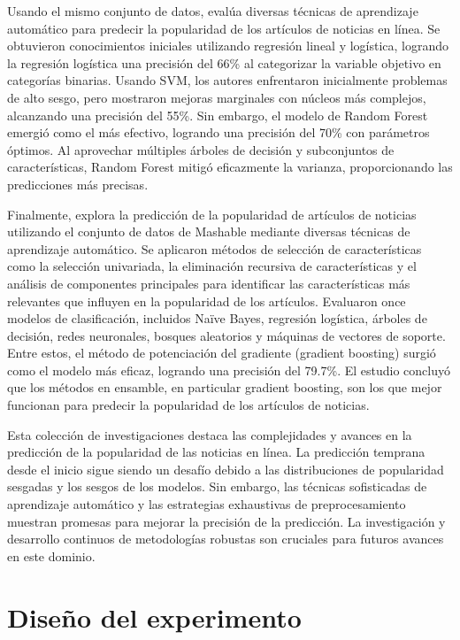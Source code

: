 \documentclass[
  number,
  preprint,
  3p,
  twocolumn]{elsarticle}
\begin{document}
Usando el mismo conjunto de datos, \citep{Ren2015PredictingAE} evalúa
diversas técnicas de aprendizaje automático para predecir la popularidad
de los artículos de noticias en línea. Se obtuvieron conocimientos
iniciales utilizando regresión lineal y logística, logrando la regresión
logística una precisión del 66\% al categorizar la variable objetivo en
categorías binarias. Usando SVM, los autores enfrentaron inicialmente
problemas de alto sesgo, pero mostraron mejoras marginales con núcleos
más complejos, alcanzando una precisión del 55\%. Sin embargo, el modelo
de Random Forest emergió como el más efectivo, logrando una precisión
del 70\% con parámetros óptimos. Al aprovechar múltiples árboles de
decisión y subconjuntos de características, Random Forest mitigó
eficazmente la varianza, proporcionando las predicciones más precisas.

Finalmente, \citep{khan2018} explora la predicción de la popularidad de
artículos de noticias utilizando el conjunto de datos de Mashable
mediante diversas técnicas de aprendizaje automático. Se aplicaron
métodos de selección de características como la selección univariada, la
eliminación recursiva de características y el análisis de componentes
principales para identificar las características más relevantes que
influyen en la popularidad de los artículos. Evaluaron once modelos de
clasificación, incluidos Naïve Bayes, regresión logística, árboles de
decisión, redes neuronales, bosques aleatorios y máquinas de vectores de
soporte. Entre estos, el método de potenciación del gradiente (gradient
boosting) surgió como el modelo más eficaz, logrando una precisión del
79.7\%. El estudio concluyó que los métodos en ensamble, en particular
gradient boosting, son los que mejor funcionan para predecir la
popularidad de los artículos de noticias.

Esta colección de investigaciones destaca las complejidades y avances en
la predicción de la popularidad de las noticias en línea. La predicción
temprana desde el inicio sigue siendo un desafío debido a las
distribuciones de popularidad sesgadas y los sesgos de los modelos. Sin
embargo, las técnicas sofisticadas de aprendizaje automático y las
estrategias exhaustivas de preprocesamiento muestran promesas para
mejorar la precisión de la predicción. La investigación y desarrollo
continuos de metodologías robustas son cruciales para futuros avances en
este dominio.

\section{Diseño del experimento}\label{diseuxf1o-del-experimento}
\end{document}
